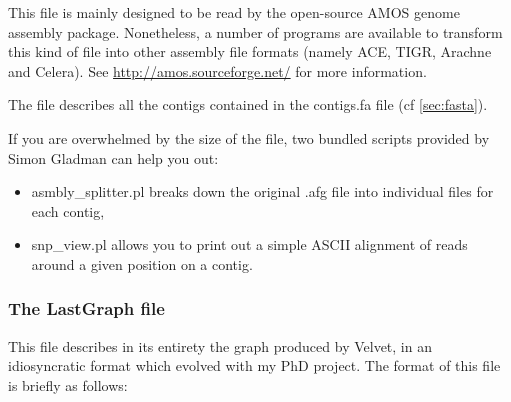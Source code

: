\documentclass{article}
\begin{document}
This file is mainly designed to be read by the open-source AMOS genome assembly package. Nonetheless, a number of programs are available to transform this kind of file into other assembly file formats (namely ACE, TIGR, Arachne and Celera). See \href{http://amos.sourceforge.net/}{http://amos.sourceforge.net/} for more information.

The file describes all the contigs contained in the contigs.fa file (cf \ref{sec:fasta}). 

If you are overwhelmed by the size of the file, two bundled scripts provided by Simon Gladman can help you out:
\begin{itemize}
\item asmbly\_splitter.pl breaks down the  original .afg file into individual files for each contig,
\item snp\_view.pl allows you to print out a simple ASCII alignment of reads around a given position on a contig.
\end{itemize}

\subsubsection{The LastGraph file}

This file describes in its entirety the graph produced by Velvet, in an idiosyncratic format which evolved with my PhD project. The format of this file is briefly as follows:
\end{document}
